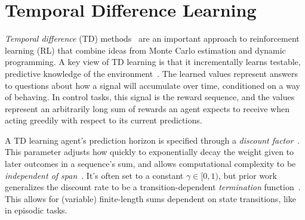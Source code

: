 \documentclass[letterpaper]{article} %
\begin{document}
\section{Temporal Difference Learning}
\label{sec:tdintro}



\textit{Temporal difference} (TD) methods~\cite{sutton1988} are an important approach to reinforcement learning (RL) that combine ideas from Monte Carlo estimation and dynamic programming. A key view of TD learning is that it incrementally learns testable, predictive knowledge of the environment~\cite{horde2011}. The learned values represent answers to questions about how a signal will accumulate over time, conditioned on a way of behaving. %
In control tasks, this signal is the reward sequence, and the values represent an arbitrarily long sum of rewards an agent expects to receive when acting greedily with respect to its current predictions.%

A TD learning agent's prediction horizon is specified through a \textit{discount factor}~\cite{rlbook2018}. This parameter adjusts how quickly to exponentially decay the weight given to later outcomes in a sequence's sum, and allows computational complexity to be \textit{independent of span}~\cite{indspan2015}. It's often set to a constant $\gamma \in [0, 1)$, but prior work generalizes the discount rate to be a transition-dependent \textit{termination} function~\cite{taskspec2016}. This allows for (variable) finite-length sums dependent on state transitions, like in episodic tasks.
\end{document}
